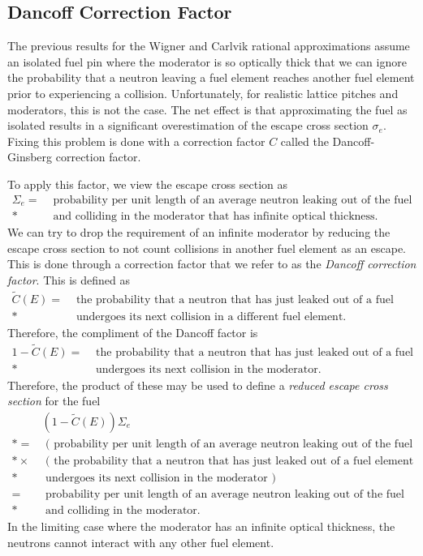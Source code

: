 \subsection{Dancoff Correction Factor}

The previous results for the Wigner and Carlvik rational approximations assume an isolated fuel pin where the moderator is so optically thick that we can ignore the probability that a neutron leaving a fuel element reaches another fuel element prior to experiencing a collision. Unfortunately, for realistic lattice pitches and moderators, this is not the case. The net effect is that approximating the fuel as isolated results in a significant overestimation of the escape cross section $\sigma_e$. Fixing this problem is done with a correction factor $C$ called the Dancoff-Ginsberg correction factor.

To apply this factor, we view the escape cross section as
\begin{align}
  \Sigma_e
  = &\text{ probability per unit length of an average neutron leaking out of the fuel} \nonumber \\*
    &\text{ and colliding in the moderator that has infinite optical thickness.} \nonumber
\end{align}
We can try to drop the requirement of an infinite moderator by reducing the escape cross section to not count collisions in another fuel element as an escape. This is done through a correction factor that we refer to as the \emph{Dancoff correction factor}. This is defined as
\begin{align}
  \widetilde{C}(E) = &\text{ the probability that a neutron that has just leaked out of a fuel element} \nonumber \\*
      &\text{ undergoes its next collision in a different fuel element.} \nonumber
\end{align}
Therefore, the compliment of the Dancoff factor is
\begin{align}
  1 - \widetilde{C}(E) = 
  &\text{ the probability that a neutron that has just leaked out of a fuel element} \nonumber \\*
  &\text{ undergoes its next collision in the moderator.} \nonumber
\end{align}
Therefore, the product of these may be used to define a \emph{reduced escape cross section} for the fuel
\begin{align}
  &(1 - \widetilde{C}(E)) \Sigma_e \nonumber \\*
  = &\text{ ( probability per unit length of an average neutron leaking out of the fuel )} \nonumber \\*
  \times    &\text{ ( the probability that a neutron that has just leaked out of a fuel element} \nonumber \\*
  &\text{ undergoes its next collision in the moderator )} \nonumber \\
  = &\text{ probability per unit length of an average neutron leaking out of the fuel } \nonumber \\* 
  &\text{ and colliding in the moderator.} \nonumber
\end{align}
In the limiting case where the moderator has an infinite optical thickness, the neutrons cannot interact with any other fuel element. 

